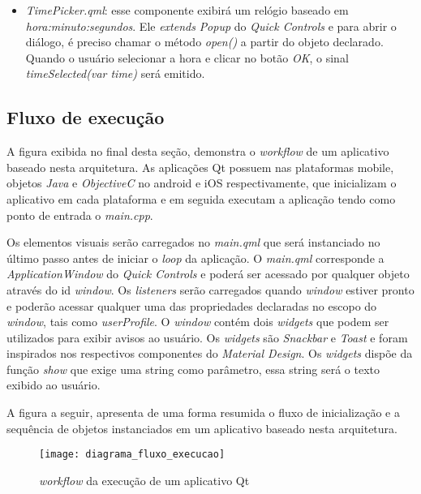 \begin{itemize}
	\item \textit{TimePicker.qml}: esse componente exibirá um relógio baseado em \textit{hora:minuto:segundos}. Ele \textit{extends} \textit{Popup} do \textit{Quick Controls} e para abrir o diálogo, é preciso chamar o método \textit{open()} a partir do objeto declarado. Quando o usuário selecionar a hora e clicar no botão \textit{OK}, o sinal \textit{timeSelected(var time)} será emitido.
\end{itemize}


\subsection{Fluxo de execução}\label{sec:solucao-desenvolvida}
A figura exibida no final desta seção, demonstra o \textit{workflow} de um aplicativo baseado nesta arquitetura. As aplicações Qt possuem nas plataformas mobile, objetos \textit{Java} e \textit{ObjectiveC} no android e iOS respectivamente, que inicializam o aplicativo em cada plataforma e em seguida executam a aplicação tendo como ponto de entrada o \textit{main.cpp}.\par

Os elementos visuais serão carregados no \textit{main.qml} que será instanciado no último passo antes de iniciar o \textit{loop} da aplicação. O \textit{main.qml} corresponde a \textit{ApplicationWindow} do \textit{Quick Controls} e poderá ser acessado por qualquer objeto através do id \textit{window}. Os \textit{listeners} serão carregados quando \textit{window} estiver pronto e poderão acessar qualquer uma das propriedades declaradas no escopo do \textit{window}, tais como \textit{userProfile}. O \textit{window} contém dois \textit{widgets} que podem ser utilizados para exibir avisos ao usuário. Os \textit{widgets} são \textit{Snackbar} e \textit{Toast} e foram inspirados nos respectivos componentes do \textit{Material Design}. Os \textit{widgets} dispõe da função \textit{show} que exige uma string como parâmetro, essa string será o texto exibido ao usuário.\par

A figura a seguir, apresenta de uma forma resumida o fluxo de inicialização e a sequência de objetos instanciados em um aplicativo baseado nesta arquitetura.

\begin{figure}[H]
	\texttt{[image: diagrama\_fluxo\_execucao]}
	\centering
	\caption{\textit{workflow} da execução de um aplicativo Qt}
\end{figure}


